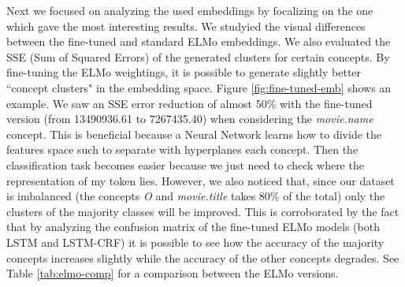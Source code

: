 \documentclass[11pt,a4paper]{article}
\begin{document}
Next we focused on analyzing the used embeddings by focalizing on the one which gave the most interesting results. We studyied the visual differences between the fine-tuned and standard ELMo embeddings. We also evaluated the SSE (Sum of Squared Errors) of the generated clusters for certain concepts. By fine-tuning the ELMo weightings, it is possible to generate slightly better ``concept clusters" in the embedding space. Figure \ref{fig:fine-tuned-emb} shows an example. We saw an SSE error reduction of almost 50\% with the fine-tuned version (from 13490936.61 to 7267435.40) when considering the \textit{movie.name} concept. This is beneficial because a Neural Network learns how to divide the features space such to separate with hyperplanes each concept. Then the classification task becomes easier because we just need to check where the representation of my token lies.  However, we also noticed that, since our dataset is imbalanced (the concepts \textit{O} and \textit{movie.title} takes 80\% of the total) only the clusters of the majority classes will be improved. This is corroborated by the fact that by analyzing the confusion matrix of the fine-tuned ELMo models (both LSTM and LSTM-CRF) it is possible to see how the accuracy of the majority concepts increases slightly while the accuracy of the other concepts degrades. See Table \ref{tab:elmo-comp} for a comparison between the ELMo versions. 

\begin{table}[]
\centering
{}
\caption{Given the top-seven concepts from the test dataset, we compute the tagging accuracy when using the LSTM-CRF and the CHAR+POS+NER features. The first five concepts appear more than 2\% over the entire dataset, while the last two appear less than 1\%. It is possible to see how the performances increase for the first fìive when using the fine-tuned ELMo, while the other two accuracies decrease with respect to the averaged ELMo.}
\label{tab:elmo-comp}
\end{table}
\end{document}
